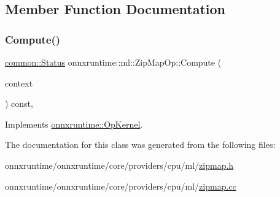 \subsection{Member Function Documentation}
\mbox{\label{classonnxruntime_1_1ml_1_1ZipMapOp_a63bf02989d89129fb7443ad0fbd9ae45}} 
\subsubsection{\texorpdfstring{Compute()}{Compute()}}
{\footnotesize\ttfamily \mbox{\hyperlink{classonnxruntime_1_1common_1_1Status}{common\+::\+Status}} onnxruntime\+::ml\+::\+Zip\+Map\+Op\+::\+Compute (\begin{DoxyParamCaption}\item[{\mbox{\hyperlink{classonnxruntime_1_1OpKernelContext}{Op\+Kernel\+Context}} $\ast$}]{context }\end{DoxyParamCaption}) const\hspace{0.3cm}{\ttfamily [override]}, {\ttfamily [virtual]}}



Implements \mbox{\hyperlink{classonnxruntime_1_1OpKernel_a9eca8656a78b1b3ab9d3351a12798650}{onnxruntime\+::\+Op\+Kernel}}.



The documentation for this class was generated from the following files\+:\begin{DoxyCompactItemize}
\item 
onnxruntime/onnxruntime/core/providers/cpu/ml/\mbox{\hyperlink{zipmap_8h}{zipmap.\+h}}\item 
onnxruntime/onnxruntime/core/providers/cpu/ml/\mbox{\hyperlink{zipmap_8cc}{zipmap.\+cc}}\end{DoxyCompactItemize}
